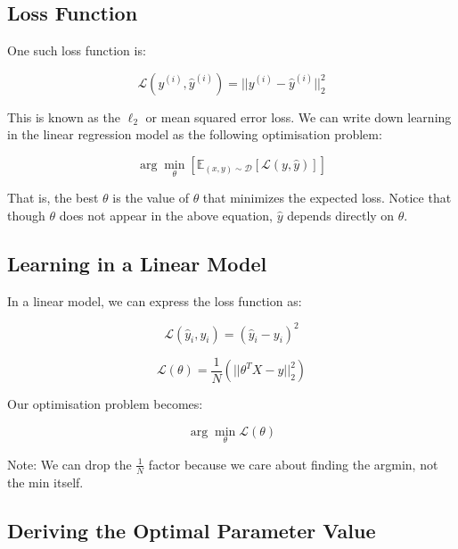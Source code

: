 \subsection{Loss Function}

One such loss function is:

\begin{equation}
    \mathcal{L}(y^{(i)}, \hat{y}^{(i)}) = ||y^{(i)} - \hat{y}^{(i)}||_2^2
\end{equation}

This is known as the $\ell_2$ or mean squared error loss. We can write down learning in the linear regression model as the following optimisation problem:

\begin{equation}
    \arg\min_{\theta} [\mathbb{E}_{(x,y)\sim\mathcal{D}}[\mathcal{L}(y, \hat{y})]]
\end{equation}

That is, the best $\theta$ is the value of $\theta$ that minimizes the expected loss. Notice that though $\theta$ does not appear in the above equation, $\hat{y}$ depends directly on $\theta$.

\subsection{Learning in a Linear Model}

In a linear model, we can express the loss function as:

\begin{equation}
    \mathcal{L}(\hat{y}_i, y_i) = (\hat{y}_i - y_i)^2
\end{equation}

\begin{equation}
    \mathcal{L}(\theta) = \frac{1}{N} \left( ||\theta^T X - y||_2^2 \right)
\end{equation}

Our optimisation problem becomes:

\begin{equation}
    \arg\min_{\theta} \mathcal{L}(\theta)
\end{equation}

Note: We can drop the $\frac{1}{N}$ factor because we care about finding the argmin, not the min itself.

\subsection{Deriving the Optimal Parameter Value}

